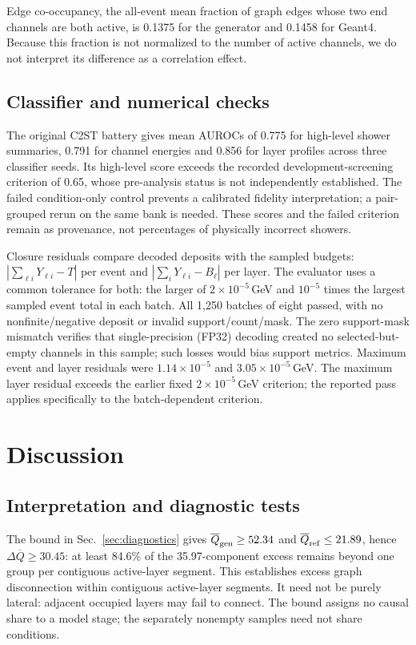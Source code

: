 \documentclass[10pt]{article}
\begin{document}
Edge co-occupancy, the all-event mean fraction of graph edges whose two end channels are both active, is 0.1375 for the generator and 0.1458 for Geant4. Because this fraction is not normalized to the number of active channels, we do not interpret its difference as a correlation effect.

\subsection{Classifier and numerical checks}

The original C2ST battery gives mean AUROCs of 0.775 for high-level shower summaries, 0.791 for channel energies and 0.856 for layer profiles across three classifier seeds. Its high-level score exceeds the recorded development-screening criterion of 0.65, whose pre-analysis status is not independently established. The failed condition-only control prevents a calibrated fidelity interpretation; a pair-grouped rerun on the same bank is needed. These scores and the failed criterion remain as provenance, not percentages of physically incorrect showers.

Closure residuals compare decoded deposits with the sampled budgets: $|\sum_{\ell i}Y_{\ell i}-T|$ per event and $|\sum_iY_{\ell i}-B_\ell|$ per layer. The evaluator uses a common tolerance for both: the larger of $2\times10^{-5}$\,GeV and $10^{-5}$ times the largest sampled event total in each batch. All 1,250 batches of eight passed, with no nonfinite/negative deposit or invalid support/count/mask. The zero support-mask mismatch verifies that single-precision (FP32) decoding created no selected-but-empty channels in this sample; such losses would bias support metrics. Maximum event and layer residuals were $1.14\times10^{-5}$ and $3.05\times10^{-5}$\,GeV. The maximum layer residual exceeds the earlier fixed $2\times10^{-5}$\,GeV criterion; the reported pass applies specifically to the batch-dependent criterion.

\FloatBarrier
\section{Discussion}
\label{sec:discussion}

\subsection{Interpretation and diagnostic tests}

The bound in Sec.~\ref{sec:diagnostics} gives $\overline Q_{\rm gen}\geq52.34$ and $\overline Q_{\rm ref}\leq21.89$, hence $\Delta\overline Q\geq30.45$: at least 84.6\% of the 35.97-component excess remains beyond one group per contiguous active-layer segment. This establishes excess graph disconnection within contiguous active-layer segments. It need not be purely lateral: adjacent occupied layers may fail to connect. The bound assigns no causal share to a model stage; the separately nonempty samples need not share conditions.
\end{document}
